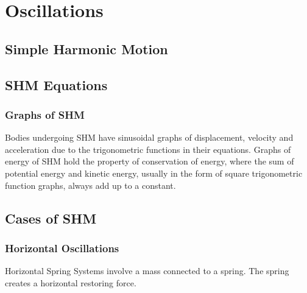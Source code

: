 \documentclass[../main]{subfiles}
\begin{document}
\section{Oscillations}

\subsection{Simple Harmonic Motion}


\subsection{SHM Equations}


\subsubsection{Graphs of SHM}

Bodies undergoing SHM have sinusoidal graphs of displacement, velocity and acceleration due to the trigonometric functions in their equations. Graphs of energy of SHM hold the property of conservation of energy, where the sum of potential energy and kinetic energy, usually in the form of square trigonometric function graphs, always add up to a constant.

\subsection{Cases of SHM}

\subsubsection{Horizontal Oscillations}

Horizontal Spring Systems involve a mass connected to a spring. The spring creates a horizontal restoring force.
\end{document}
